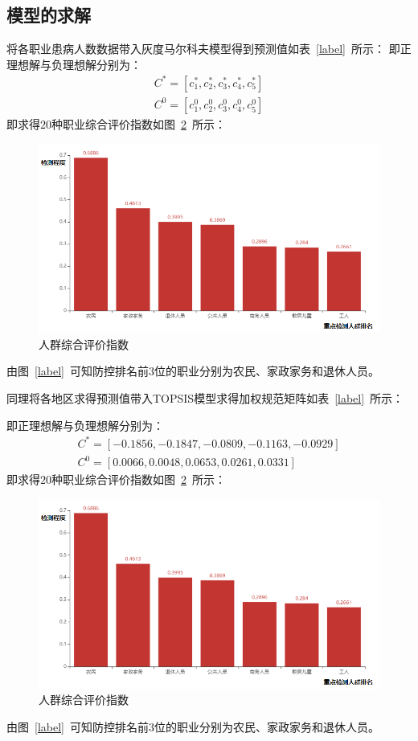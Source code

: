 \documentclass{whutmod}
\begin{document}
    \subsection{模型的求解}
    将各职业患病人数数据带入灰度马尔科夫模型得到预测值如表~\ref{label}~所示：
    即正理想解与负理想解分别为：
    \begin{gather}
    C^{*}=[c_{1}^{*},c_{2}^{*},c_{3}^{*},c_{4}^{*},c_{5}^{*}]\\
    C^{0}=[c_{1}^{0},c_{2}^{0},c_{3}^{0},c_{4}^{0},c_{5}^{0}]
    \end{gather}
    即求得$20$种职业综合评价指数如图~\ref{oc}~所示：
    \begin{figure}[H]
    	\centering
    	\includegraphics[width=\textwidth]{figures/oc.png}
    	\caption{人群综合评价指数}\label{oc}
    \end{figure}
	

    由图~\ref{label}~可知防控排名前$3$位的职业分别为农民、家政家务和退休人员。
    
    同理将各地区求得预测值带入TOPSIS模型求得加权规范矩阵如表~\ref{label}~所示：
    
    
      即正理想解与负理想解分别为：
    \begin{gather}
    C^{*}=[-0.1856,-0.1847,-0.0809,-0.1163,-0.0929]\\
    C^{0}=[0.0066,0.0048,0.0653,0.0261,0.0331]
    \end{gather}
    即求得$20$种职业综合评价指数如图~\ref{oc}~所示：
    \begin{figure}[H]
    	\centering
    	\includegraphics[width=.9\textwidth]{figures/oc.png}
    	\caption{人群综合评价指数}\label{oc}
    \end{figure}
    由图~\ref{label}~可知防控排名前$3$位的职业分别为农民、家政家务和退休人员。
    
\end{document}
